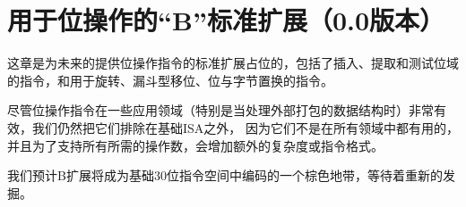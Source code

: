 \chapter{用于位操作的“B”标准扩展（0.0版本）}
\label{sec:bits}

这章是为未来的提供位操作指令的标准扩展占位的，包括了插入、提取和测试位域的指令，和用于旋转、漏斗型移位、位与字节置换的指令。

\begin{commentary}
尽管位操作指令在一些应用领域（特别是当处理外部打包的数据结构时）非常有效，我们仍然把它们排除在基础ISA之外，
因为它们不是在所有领域中都有用的，并且为了支持所有所需的操作数，会增加额外的复杂度或指令格式。

我们预计B扩展将成为基础30位指令空间中编码的一个棕色地带，等待着重新的发掘。
\end{commentary}

